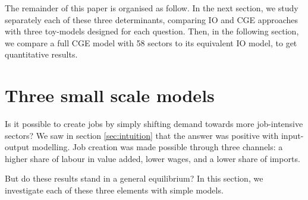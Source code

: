 The remainder of this paper is organised as follow.
In the next section, we study separately each of these three determinants, comparing IO and CGE approaches with three toy-models designed for each question. 
Then, in the following section, we compare a full CGE model with 58 sectors to its equivalent IO model, to get quantitative results.



\section{Three small scale models} \label{sec:smallModels}
Is it possible to create jobs by simply shifting demand towards more job-intensive sectors? We saw in section \ref{sec:intuition} that the answer was positive with input-output modelling. 
Job creation was made possible through three channels: a higher share of labour in value added, lower wages, and a lower share of imports. 

But do these results stand in a general equilibrium? In this section, we investigate each of these three elements with simple models.

